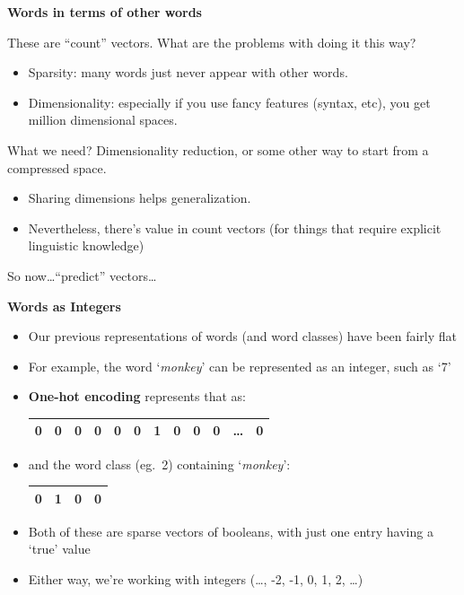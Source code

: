 \documentclass{beamer}
\newcommand{\pagestepalt}[2]{
  \begin{frame}[t]
    \begin{minipage}[t][0.26\textheight][t]{\textwidth}
      \begin{center}
        \huge
        \textbf{#1}
      \end{center}
    \end{minipage}
    
    \begin{minipage}[t][0.7\textheight][c]{\textwidth}
      #2
    \end{minipage}
  \end{frame}
}
\begin{document}
\pagestepalt{Words in terms of other words}{
  These are ``count'' vectors. 
  What are the problems with doing it this way?\pause
  \begin{itemize}
    \item Sparsity: many words just never appear with other words.\pause
    \item Dimensionality: especially if you use fancy features (syntax, etc),
      you get million dimensional spaces.\pause
  \end{itemize}
  What we need? Dimensionality reduction, or some other way to start
  from a compressed space.\pause
  \begin{itemize}
  \item Sharing dimensions helps generalization.\pause
  \item Nevertheless, there's value in count vectors (for things that require explicit linguistic knowledge)\pause
  \end{itemize}
  So now\ldots ``predict'' vectors\ldots
}

\pagestepalt{Words as Integers}{
\begin{itemize}
	\item Our previous representations of words (and word classes) have been fairly flat
	\item For example, the word `\textit{monkey}' can be represented as an integer, such as `7'
	\pause
	\item \textbf{One-hot encoding} represents that as: \\[0.4em]
		\begin{tabular}{|c|c|c|c|c|c|c|c|c|c|c|c|}
		    \hline
			0 & 0 & 0 & 0 & 0 & 0 & 1 & 0 & 0 & 0 & \ldots & 0 \\
		    \hline
		\end{tabular}
	\pause

\item and the word class (eg.\ 2) containing `\textit{monkey}': \\[0.4em]
		\begin{tabular}{|c|c|c|c|}
		    \hline
			0 & 1 & 0 & 0 \\
		    \hline
		\end{tabular}

	\pause
	\item Both of these are sparse vectors of booleans, with just one entry having a `true' value
	\pause
	\item Either way, we're working with integers {\small (\ldots, -2, -1, 0, 1, 2, \ldots)}
\end{itemize}
}
\end{document}

